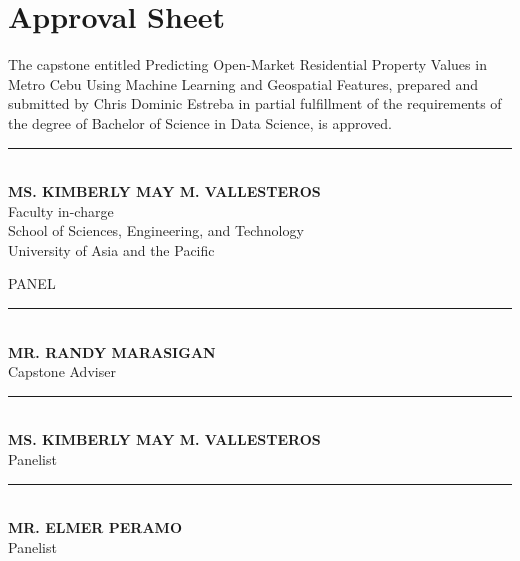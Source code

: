 \clearpage
\section*{Approval Sheet}

{\linespread{1}\selectfont
The capstone entitled Predicting Open-Market Residential Property Values in Metro Cebu Using Machine Learning and Geospatial Features, prepared and submitted by Chris Dominic Estreba in partial fulfillment of the requirements of the degree of Bachelor of Science in Data Science, is approved.

\vspace{0.6in}

{\centering
\rule{3in}{0.4pt}\\[3pt]
\textbf{MS. KIMBERLY MAY M. VALLESTEROS}\\
Faculty in-charge\\
School of Sciences, Engineering, and Technology\\
University of Asia and the Pacific\par}

\vspace{0.45in}

{\centering PANEL\par}

\vspace{0.65in}

{\centering
\rule{3in}{0.4pt}\\[3pt]
\textbf{MR. RANDY MARASIGAN}\\
Capstone Adviser\par}

\vspace{0.7in}

{\centering
\rule{3in}{0.4pt}\\[3pt]
\textbf{MS. KIMBERLY MAY M. VALLESTEROS}\\
Panelist\par}

\vspace{0.7in}

{\centering
\rule{3in}{0.4pt}\\[3pt]
\textbf{MR. ELMER PERAMO}\\
Panelist\par}
\par}

